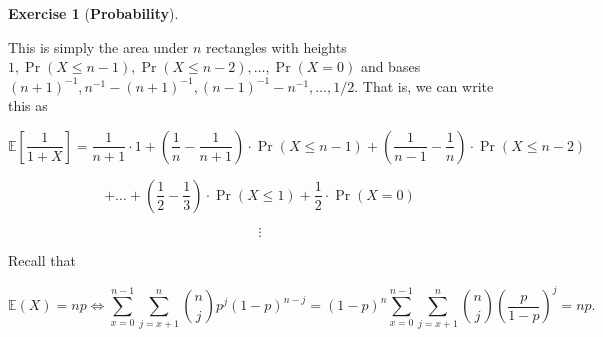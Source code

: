 \documentclass{article}
\theoremstyle{definition}
\newtheorem{exercise}{Exercise}
\theoremstyle{definition}
\theoremstyle{definition}
\theoremstyle{definition}
\newcommand{\E}{\mathbb{E}}
\begin{document}
\begin{exercise}[\textbf{Probability}]
\begin{enumerate}[(a)]
This is simply the area under \(n\) rectangles with heights \(1, \Pr(X \leq n-1), \Pr(X \leq n- 2), \ldots, \Pr(X =0)\) and bases \((n+1)^{-1}, n^{-1} - (n+1)^{-1}, (n-1)^{-1} - n^{-1},  \ldots, 1/2\). That is, we can write this as

\[
\E \left[ \frac{1}{1 + X} \right] = \frac{1}{n+1} \cdot 1 + \left( \frac{1}{n} - \frac{1}{n+1} \right) \cdot \Pr(X \leq n-1) + \left( \frac{1}{n-1} - \frac{1}{n} \right) \cdot \Pr(X \leq n-2) 
\]

\[
+ \ldots  + \left( \frac{1}{2} - \frac{1}{3} \right)  \cdot \Pr(X\leq 1)  + \frac{1}{2} \cdot \Pr(X=0) 
\]

%

\[
\vdots
\]

Recall that 

\[
\E(X) = np \iff \sum_{x=0}^{n-1} \sum_{j=x+1}^n  \binom{n}{j} p^j(1-p)^{n-j}   =  (1-p) ^n\sum_{x=0}^{n-1} \sum_{j=x+1}^n  \binom{n}{j} \left( \frac{p}{1-p} \right) ^j= np.
\]

\end{enumerate}

\end{exercise}
\end{document}
